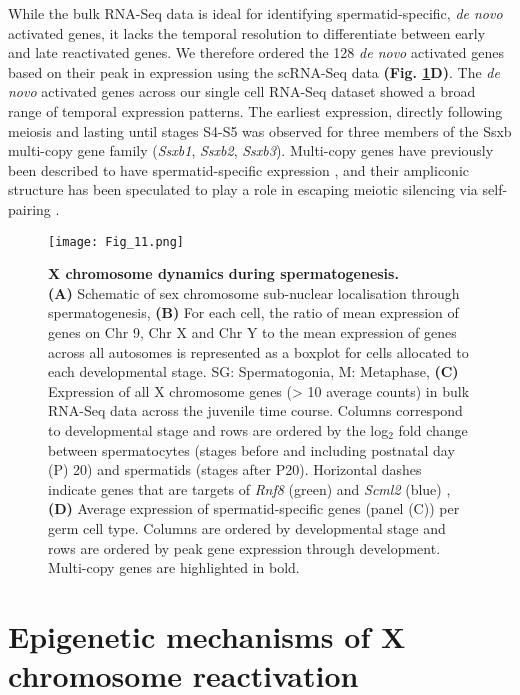 While the bulk RNA-Seq data is ideal for identifying spermatid-specific, \emph{de novo} activated genes, it lacks the temporal resolution to differentiate between early and late reactivated genes. We therefore ordered the 128 \emph{de novo} activated genes based on their peak in expression using the scRNA-Seq data \textbf{(Fig. \ref{fig3:X_reactivation}D)}. The \emph{de novo} activated genes across our single cell RNA-Seq dataset showed a broad range of temporal expression patterns. The earliest expression, directly following meiosis and lasting until stages S4-S5 was observed for three members of the \gls{Ssxb} multi-copy gene family (\textit{Ssxb1}, \textit{Ssxb2}, \textit{Ssxb3}). Multi-copy genes have previously been described to have spermatid-specific expression \citep{Mueller2008}, and their ampliconic structure has been speculated to play a role in escaping meiotic silencing via self-pairing \citep{Disteche2008}.

\newpage

\begin{figure}[!h]
\centering
\texttt{[image: Fig\_11.png]}
\caption[X chromosome dynamics during spermatogenesis]{\textbf{X chromosome dynamics during spermatogenesis.} \\
\textbf{(A)} Schematic of sex chromosome sub-nuclear localisation through spermatogenesis, \textbf{(B)} For each cell, the ratio of mean expression of genes on Chr 9, Chr X and Chr Y to the mean expression of genes across all autosomes is represented as a boxplot for cells allocated to each developmental stage. SG: Spermatogonia, M: Metaphase, \textbf{(C)} Expression of all X chromosome genes (> 10 average counts) in bulk RNA-Seq data across the juvenile time course. Columns correspond to developmental stage and rows are ordered by the log$_2$ fold change between spermatocytes (stages before and including postnatal day (P) 20) and spermatids (stages after P20). Horizontal dashes indicate genes that are targets of \textit{Rnf8} (green) and \textit{Scml2} (blue) \citep{Adams2018}, \textbf{(D)} Average expression of spermatid-specific genes (panel (C)) per germ cell type. Columns are ordered by developmental stage and rows are ordered by peak gene expression through development. Multi-copy genes are highlighted in bold.}
\label{fig3:X_reactivation}
\end{figure}

\newpage

\section{Epigenetic mechanisms of X chromosome reactivation}

